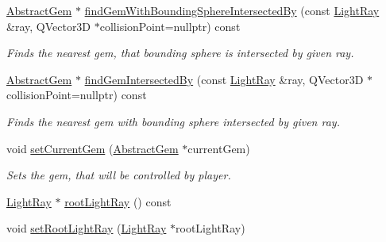 \begin{DoxyCompactItemize}
\item 
\hyperlink{class_abstract_gem}{Abstract\+Gem} $\ast$ \hyperlink{class_scene_af96ea722705769055ef2f9e9572f3fa0}{find\+Gem\+With\+Bounding\+Sphere\+Intersected\+By} (const \hyperlink{class_light_ray}{Light\+Ray} \&ray, Q\+Vector3\+D $\ast$collision\+Point=nullptr) const 
\begin{DoxyCompactList}\small\item\em Finds the nearest gem, that bounding sphere is intersected by given ray. \end{DoxyCompactList}\item 
\hyperlink{class_abstract_gem}{Abstract\+Gem} $\ast$ \hyperlink{class_scene_a2a2cee0a97d8436aac1cd582904af459}{find\+Gem\+Intersected\+By} (const \hyperlink{class_light_ray}{Light\+Ray} \&ray, Q\+Vector3\+D $\ast$collision\+Point=nullptr) const 
\begin{DoxyCompactList}\small\item\em Finds the nearest gem with bounding sphere intersected by given ray. \end{DoxyCompactList}\item 
void \hyperlink{class_scene_afcaeead320358b9d9dd02a113ef97c44}{set\+Current\+Gem} (\hyperlink{class_abstract_gem}{Abstract\+Gem} $\ast$current\+Gem)
\begin{DoxyCompactList}\small\item\em Sets the gem, that will be controlled by player. \end{DoxyCompactList}\item 
\hyperlink{class_light_ray}{Light\+Ray} $\ast$ \hyperlink{class_scene_a7de6dcc38dd6398f71af71295ae09966}{root\+Light\+Ray} () const 
\item 
void \hyperlink{class_scene_a3da6be3089fe335bf628ef58d23cda18}{set\+Root\+Light\+Ray} (\hyperlink{class_light_ray}{Light\+Ray} $\ast$root\+Light\+Ray)
\end{DoxyCompactItemize}
